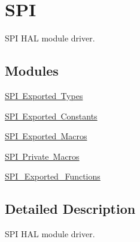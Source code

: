 \hypertarget{group___s_p_i}{}\section{S\+PI}
\label{group___s_p_i}


S\+PI H\+AL module driver.  


\subsection*{Modules}
\begin{DoxyCompactItemize}
\item 
\mbox{\hyperlink{group___s_p_i___exported___types}{S\+P\+I Exported Types}}
\item 
\mbox{\hyperlink{group___s_p_i___exported___constants}{S\+P\+I Exported Constants}}
\item 
\mbox{\hyperlink{group___s_p_i___exported___macros}{S\+P\+I Exported Macros}}
\item 
\mbox{\hyperlink{group___s_p_i___private___macros}{S\+P\+I Private Macros}}
\item 
\mbox{\hyperlink{group___s_p_i___exported___functions}{S\+P\+I\+\_\+\+Exported\+\_\+\+Functions}}
\end{DoxyCompactItemize}


\subsection{Detailed Description}
S\+PI H\+AL module driver. 

